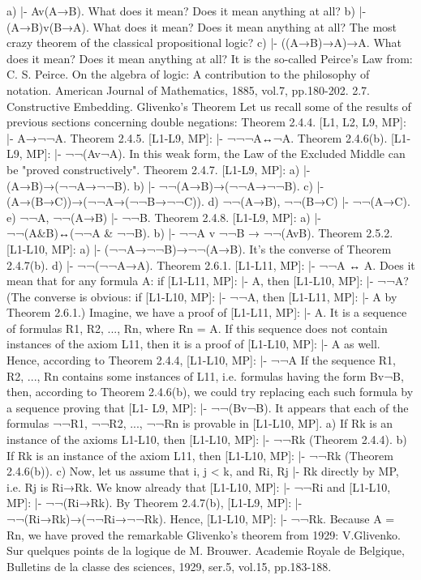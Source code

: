 a) |- Av(A→B). What does it mean? Does it mean anything at all?
b) |- (A→B)v(B→A). What does it mean? Does it mean anything at all? The most crazy theorem of the
classical propositional logic?
c) |- ((A→B)→A)→A. What does it mean? Does it mean anything at all? It is the so-called Peirce's Law
from:
C. S. Peirce. On the algebra of logic: A contribution to the philosophy of notation. American Journal of Mathematics, 1885,
vol.7, pp.180-202.
2.7. Constructive Embedding. Glivenko's Theorem
Let us recall some of the results of previous sections concerning double negations:
Theorem 2.4.4. [L1, L2, L9, MP]: |- A→¬¬A.
Theorem 2.4.5. [L1-L9, MP]: |- ¬¬¬A↔¬A.
Theorem 2.4.6(b). [L1-L9, MP]: |- ¬¬(Av¬A). In this weak form, the Law of the Excluded Middle can be
"proved constructively".
Theorem 2.4.7. [L1-L9, MP]: a) |- (A→B)→(¬¬A→¬¬B).
b) |- ¬¬(A→B)→(¬¬A→¬¬B).
c) |- (A→(B→C))→(¬¬A→(¬¬B→¬¬C)).
d) ¬¬(A→B), ¬¬(B→C) |- ¬¬(A→C).
e) ¬¬A, ¬¬(A→B) |- ¬¬B.
Theorem 2.4.8. [L1-L9, MP]: a) |- ¬¬(A&B)↔(¬¬A & ¬¬B).
b) |- ¬¬A v ¬¬B → ¬¬(AvB).
Theorem 2.5.2. [L1-L10, MP]: a) |- (¬¬A→¬¬B)→¬¬(A→B). It's the converse of Theorem 2.4.7(b).
d) |- ¬¬(¬¬A→A).
Theorem 2.6.1. [L1-L11, MP]: |- ¬¬A ↔ A.
Does it mean that for any formula A: if [L1-L11, MP]: |- A, then [L1-L10, MP]: |- ¬¬A? (The converse is
obvious: if [L1-L10, MP]: |- ¬¬A, then [L1-L11, MP]: |- A by Theorem 2.6.1.)
Imagine, we have a proof of [L1-L11, MP]: |- A. It is a sequence of formulas R1, R2, ..., Rn, where Rn = A.
If this sequence does not contain instances of the axiom L11, then it is a proof of [L1-L10, MP]: |- A as
well. Hence, according to Theorem 2.4.4, [L1-L10, MP]: |- ¬¬A
If the sequence R1, R2, ..., Rn contains some instances of L11, i.e. formulas having the form Bv¬B, then,
according to Theorem 2.4.6(b), we could try replacing each such formula by a sequence proving that [L1-
L9, MP]: |- ¬¬(Bv¬B). It appears that each of the formulas ¬¬R1, ¬¬R2, ..., ¬¬Rn is provable in [L1-L10,
MP].
a) If Rk is an instance of the axioms L1-L10, then [L1-L10, MP]: |- ¬¬Rk (Theorem 2.4.4).
b) If Rk is an instance of the axiom L11, then [L1-L10, MP]: |- ¬¬Rk (Theorem 2.4.6(b)).
c) Now, let us assume that i, j < k, and Ri, Rj |- Rk directly by MP, i.e. Rj is Ri→Rk. We know already that
[L1-L10, MP]: |- ¬¬Ri and [L1-L10, MP]: |- ¬¬(Ri→Rk). By Theorem 2.4.7(b), [L1-L9, MP]: |-
¬¬(Ri→Rk)→(¬¬Ri→¬¬Rk). Hence, [L1-L10, MP]: |- ¬¬Rk.
Because A = Rn, we have proved the remarkable Glivenko's theorem from 1929:
V.Glivenko. Sur quelques points de la logique de M. Brouwer. Academie Royale de Belgique, Bulletins de la classe des
sciences, 1929, ser.5, vol.15, pp.183-188.
